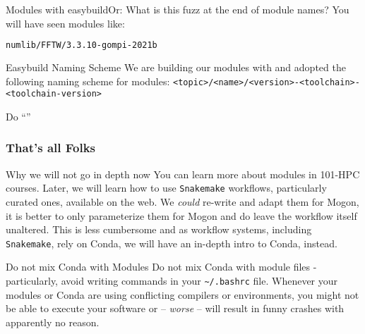\begin{frame}[fragile]
   {Modules with easybuild\newline Or: What is this fuzz at the end of module names?}
   You will have seen modules like:
   \begin{lstlisting}[language=Bash, style=Shell]
numlib/FFTW/3.3.10-gompi-2021b   
   \end{lstlisting}
   \pause
   \begin{block}{Easybuild Naming Scheme}
    We are building our modules with  and adopted the following naming scheme for modules:\newline
    \footnotesize \verb+<topic>/<name>/<version>-<toolchain>-<toolchain-version>+
   \end{block}
   \pause
   \begin{task}
   	  Do ``''
   \end{task}
\end{frame}

\begin{frame}[fragile]
  \frametitle{That's all Folks}
   \vspace{-0.8em}
  \begin{alertblock}{Why we will not go in depth now}
You can learn more about modules in 101-HPC courses. Later, we will learn how to use \texttt{Snakemake} workflows, particularly curated ones, available on the web. We \emph{could} re-write and adapt them for Mogon, it is better to only parameterize them for Mogon and do leave the workflow itself unaltered. This is less cumbersome and as workflow systems, including \texttt{Snakemake}, rely on Conda, we will have an in-depth intro to Conda, instead.
  \end{alertblock}
  \vfill
  \begin{alertblock}{Do not mix Conda with Modules}
   Do not mix Conda with module files - particularly, avoid writing  commands in your \texttt{\textasciitilde/.bashrc} file.\newline
   Whenever your modules or Conda are using conflicting compilers or environments, you might not be able to execute your software or -- \emph{worse} -- will result in funny crashes with apparently no reason.
  \end{alertblock}
\end{frame}

